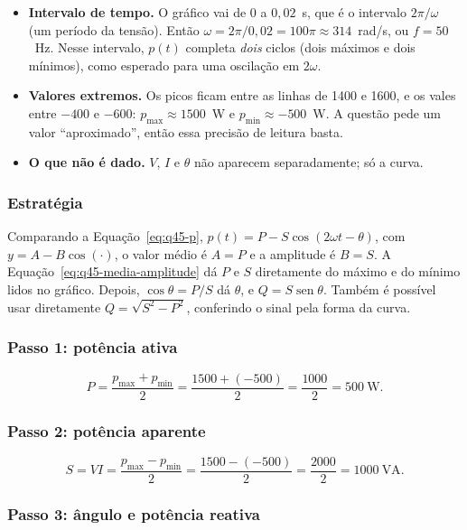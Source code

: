 \documentclass[a4paper,11pt]{article}
\providecommand{\sen}{\operatorname{sen}}   %
\numberwithin{equation}{section}
\numberwithin{figure}{section}
\numberwithin{table}{section}
\newcommand{\passo}[1]{{\color{blue_theme}\bfseries #1}\enspace}
\begin{document}
\begin{itemize}
  \item \passo{Intervalo de tempo.} O gráfico vai de $0$ a $0{,}02$~s, que
        é o intervalo $2\pi/\omega$ (um período da tensão). Então $\omega =
        2\pi/0{,}02 = 100\pi \approx 314$~rad/s, ou $f = 50$~Hz. Nesse
        intervalo, $p(t)$ completa \emph{dois} ciclos (dois máximos e dois
        mínimos), como esperado para uma oscilação em $2\omega$.
  \item \passo{Valores extremos.} Os picos ficam entre as linhas de 1400 e
        1600, e os vales entre $-400$ e $-600$:
        $p_{\max} \approx 1500$~W e $p_{\min} \approx -500$~W. A questão
        pede um valor \enquote{aproximado}, então essa precisão de leitura
        basta.
  \item \passo{O que não é dado.} $V$, $I$ e $\theta$ não aparecem
        separadamente; só a curva.
\end{itemize}

\subsubsection{Estratégia}

Comparando a Equação~\eqref{eq:q45-p}, $p(t) = P - S\cos(2\omega t -
\theta)$, com $y = A - B\cos(\cdot)$, o valor médio é $A = P$ e a amplitude
é $B = S$. A Equação~\eqref{eq:q45-media-amplitude} dá $P$ e $S$ diretamente
do máximo e do mínimo lidos no gráfico. Depois, $\cos\theta = P/S$ dá
$\theta$, e $Q = S\sen\theta$. Também é possível usar diretamente $Q =
\sqrt{S^2 - P^2}$, conferindo o sinal pela forma da curva.

\subsubsection{Passo 1: potência ativa}

\[
  P = \frac{p_{\max} + p_{\min}}{2}
    = \frac{1500 + (-500)}{2}
    = \frac{1000}{2} = 500~\text{W}.
\]

\subsubsection{Passo 2: potência aparente}

\[
  S = VI = \frac{p_{\max} - p_{\min}}{2}
    = \frac{1500 - (-500)}{2}
    = \frac{2000}{2} = 1000~\text{VA}.
\]

\subsubsection{Passo 3: ângulo e potência reativa}
\end{document}
